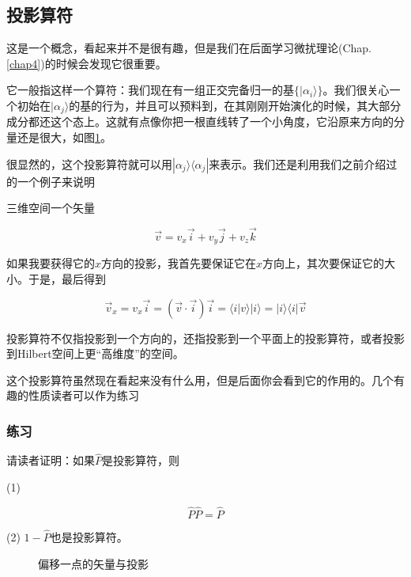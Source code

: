 \subsection{投影算符}

这是一个概念，看起来并不是很有趣，但是我们在后面学习微扰理论(Chap. {\ref{chap4}})的时候会发现它很重要。

它一般指这样一个算符：我们现在有一组正交完备归一的基$\{|\alpha_i\rangle\}$。我们很关心一个初始在$|\alpha_j\rangle$的基的行为，并且可以预料到，在其刚刚开始演化的时候，其大部分成分都还这个态上。这就有点像你把一根直线转了一个小角度，它沿原来方向的分量还是很大，如图\ref{Fig1.1}。

很显然的，这个投影算符就可以用$|\alpha_j\rangle\langle\alpha_j|$来表示。我们还是利用我们之前介绍过的一个例子来说明

\begin{exam}{}

三维空间一个矢量

\begin{equation}
\vec{v} = v_x\vec{i} + v_y\vec{j} + v_z \vec{k}
\end{equation}

如果我要获得它的$x$方向的投影，我首先要保证它在$x$方向上，其次要保证它的大小。于是，最后得到

\begin{equation}
\vec{v}_x = v_x\vec{i} = (\vec{v}\cdot\vec{i})\vec{i} = \langle i|v\rangle |i\rangle = |i\rangle\langle i| \vec{v}
\end{equation}

\end{exam}

投影算符不仅指投影到一个方向的，还指投影到一个平面上的投影算符，或者投影到Hilbert空间上更“高维度”的空间。

这个投影算符虽然现在看起来没有什么用，但是后面你会看到它的作用的。几个有趣的性质读者可以作为练习

\subsubsection{练习}
请读者证明：如果$\hat{P}$是投影算符，则

(1)

\begin{equation}
\hat{P}\hat{P} = \hat{P}
\end{equation}

(2) $1-\hat{P}$也是投影算符。


\begin{figure}
\centering
{}
\caption{偏移一点的矢量与投影}\label{Fig1.1}
\end{figure}

